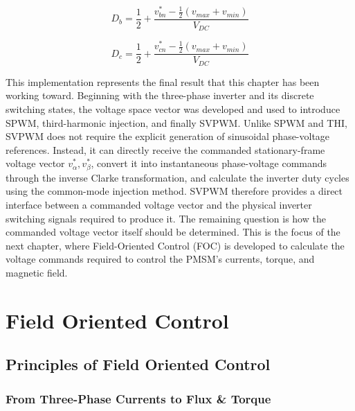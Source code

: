 \documentclass{article}
\begin{document}
\begin{equation}
    D_b = \frac{1}{2} + \frac{v_{bn}^* - \frac{1}{2}(v_{max} + v_{min})}{V_{DC}}
\end{equation}

\begin{equation}
    D_c = \frac{1}{2} + \frac{v_{cn}^* - \frac{1}{2}(v_{max} + v_{min})}{V_{DC}}
\end{equation}

This implementation represents the final result that this chapter has been working toward. Beginning with the three-phase inverter and its discrete switching states, the voltage space vector was developed and used to introduce SPWM, third-harmonic injection, and finally SVPWM. Unlike SPWM and THI, SVPWM does not require the explicit generation of sinusoidal phase-voltage references. Instead, it can directly receive the commanded stationary-frame voltage vector $v_\alpha^*,v_\beta^*$, convert it into instantaneous phase-voltage commands through the inverse Clarke transformation, and calculate the inverter duty cycles using the common-mode injection method. SVPWM therefore provides a direct interface between a commanded voltage vector and the physical inverter switching signals required to produce it. The remaining question is how the commanded voltage vector itself should be determined. This is the focus of the next chapter, where Field-Oriented Control (FOC) is developed to calculate the voltage commands required to control the PMSM's currents, torque, and magnetic field.


\pagebreak
\section{Field Oriented Control}
\label{sec:field-oriented-control}

\subsection{Principles of Field Oriented Control}
\label{sec:principles-field-oriented-control}

\subsubsection{From Three-Phase Currents to Flux \& Torque}
\label{sec:three-phase-currents-to-flux-and-torque}
\end{document}
